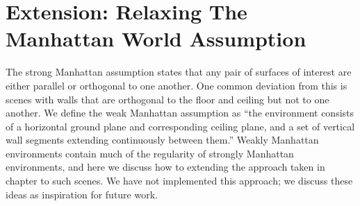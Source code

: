 


\section{Extension: Relaxing The Manhattan World Assumption}
The strong Manhattan assumption states that any pair of surfaces of
interest are either parallel or orthogonal to one another. One common
deviation from this is scenes with walls that are orthogonal to the
floor and ceiling but not to one another. We define the weak Manhattan
assumption as ``the environment consists of a horizontal ground plane
and corresponding ceiling plane, and a set of vertical wall segments
extending continuously between them.'' Weakly Manhattan environments
contain much of the regularity of strongly Manhattan environments, and
here we discuss how to extending the approach taken in chapter to such
scenes. We have not implemented this approach; we discuss these ideas
as inspiration for future work.

